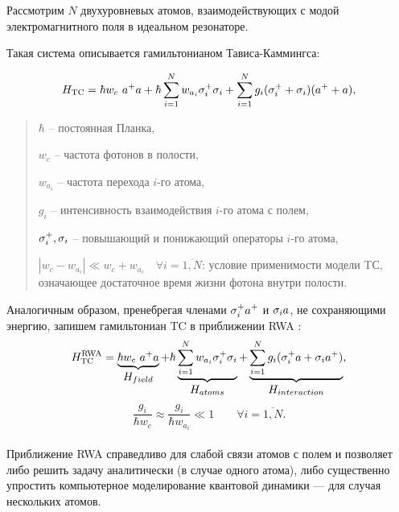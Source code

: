 Рассмотрим $N$ двухуровневых атомов, взаимодействующих с модой электромагнитного поля в идеальном резонаторе. 

Такая система описывается гамильтонианом Тависа-Каммингса:
\begin{normalsize}
	\begin{equation}
		H_{\text{TC}} =  \hbar w_{c}\ a^{+}a + \hbar \sum_{i=1}^N{w_{a_{i}}\sigma_{i}^{+}\sigma_{i}} + \sum_{i=1}^N{g_{i}(\sigma_{i}^{+}+\sigma_{i})(a^{+}+a)},
	\end{equation}
\end{normalsize}

\begin{quote}
	$\hbar $ -- постоянная Планка,
	
	$w_{c}$ -- частота фотонов в полости,
	
	$w_{a_{i}}$ -- частота перехода $i$-го атома,
	
	$g_{i}$ -- интенсивность взаимодействия $i$-го атома с полем,
	
	$\sigma_{i}^{+}, \sigma_{i}$ -- повышающий и понижающий операторы $i$-го атома,
	
	$|w_{c}-w_{a_{i}}|\ll w_{c}+w_{a_{i}} \quad\forall i = \overline{1,N}$: условие применимости модели TС, означающее достаточное время жизни фотона внутри полости.
\end{quote}

\indent Аналогичным образом, пренебрегая членами $\displaystyle{\sigma_{i}^{+}a^{+}}$ и $\displaystyle{\sigma_{i} a}$, не сохраняющими энергию, запишем гамильтониан TC в приближении RWA \cite{rwa_rabi_1,rwa_rabi_2,ozhigov_qq}:
\begin{equation}
	H_{\text{TC}}^{\text{RWA}} = \underbrace{\hbar w_{c}\ a^{+}a}_{\textstyle H_{field}} + \hbar\underbrace{\sum_{i=1}^N{w_{a_{i}}\sigma_{i}^+\sigma_{i}}}_{\textstyle H_{atoms}} + \underbrace{\sum_{i=1}^N{g_{i}(\sigma_{i}^{+}a+\sigma_{i}a^{+})}}_{\textstyle H_{interaction}},
\end{equation}
\begin{equation}
	\frac{g_{i}}{\hbar w_{c}}\approx\frac{g_{i}}{\hbar w_{a_{i}}}\ll1 \qquad \forall i = \overline{1,N}.
\end{equation}
\vspace{-1em}
\
\\[0pt]
\indent Приближение RWA \cite{rwa_rabi_1,rwa_rabi_2,ozhigov_qq} справедливо для слабой связи атомов с полем и позволяет либо решить задачу аналитически (в случае одного атома), либо существенно упростить компьютерное моделирование квантовой динамики --- для случая нескольких атомов. 

